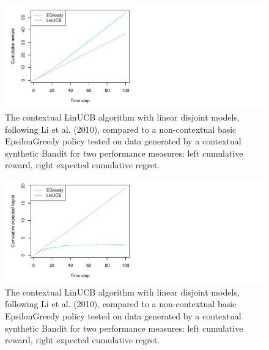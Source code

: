 \documentclass[nojss]{jss}\usepackage[]{graphicx}\usepackage[]{color}
\makeatletter
\def\maxwidth{ %
  \ifdim\Gin@nat@width>\linewidth
    \linewidth
  \else
    \Gin@nat@width
  \fi
}
\newenvironment{knitrout}{}{} %
\makeatother
\begin{document}
\begin{center}
\begin{knitrout}
\color{fgcolor}\begin{figure}[H]
\includegraphics[width=\maxwidth,]{fig/lucbpolicy-1} \caption[The contextual LinUCB algorithm with linear disjoint models, following Li et al]{The contextual LinUCB algorithm with linear disjoint models, following Li et al. (2010), compared to a non-contextual basic EpsilonGreedy policy tested on data generated by a contextual synthetic Bandit for two performance measures: left cumulative reward, right expected cumulative regret. }\label{fig:lucbpolicy1}
\end{figure}

\begin{figure}[H]
\includegraphics[width=\maxwidth,]{fig/lucbpolicy-2} \caption[The contextual LinUCB algorithm with linear disjoint models, following Li et al]{The contextual LinUCB algorithm with linear disjoint models, following Li et al. (2010), compared to a non-contextual basic EpsilonGreedy policy tested on data generated by a contextual synthetic Bandit for two performance measures: left cumulative reward, right expected cumulative regret. }\label{fig:lucbpolicy2}
\end{figure}


\end{knitrout}
\end{center}
\end{document}
